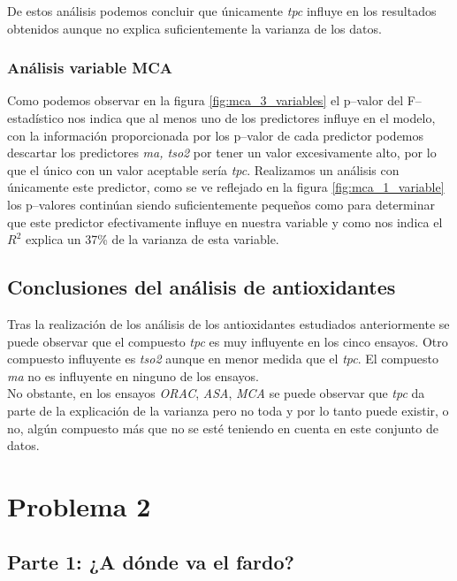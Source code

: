 \documentclass{article}
\begin{document}
De estos análisis podemos concluir que únicamente \textit{tpc} influye en los resultados obtenidos aunque no explica suficientemente la varianza de los datos.


\subsubsection{Análisis variable MCA}

Como podemos observar en la figura \ref{fig:mca_3_variables} el p--valor del F--estadístico nos indica que al menos uno de los predictores influye en el modelo, con la información proporcionada por los p--valor de cada predictor podemos descartar los predictores \textit{ma, tso2} por tener un valor excesivamente alto, por lo que el único con un valor aceptable sería \textit{tpc}. Realizamos un análisis con únicamente este predictor, como se ve reflejado en la figura \ref{fig:mca_1_variable} los p--valores continúan siendo suficientemente pequeños como para determinar que este predictor efectivamente influye en nuestra variable y como nos indica el $R^{2}$ explica un 37\% de la varianza de esta variable.\\


\subsection{Conclusiones del análisis de antioxidantes}

Tras la realización de los análisis de los antioxidantes estudiados anteriormente se puede observar que el compuesto \textit{tpc} es muy influyente en los cinco ensayos. Otro compuesto influyente es \textit{tso2} aunque en menor medida que el \textit{tpc}. El compuesto \textit{ma} no es influyente en ninguno de los ensayos.\\

No obstante, en los ensayos \textit{ORAC}, \textit{ASA}, \textit{MCA} se puede observar que \textit{tpc} da parte de la explicación de la varianza pero no toda y por lo tanto puede existir, o no, algún compuesto más que no se esté teniendo en cuenta en este conjunto de datos.


\newpage
\section{Problema 2}

\subsection{Parte 1: ¿A dónde va el fardo?}
\end{document}
